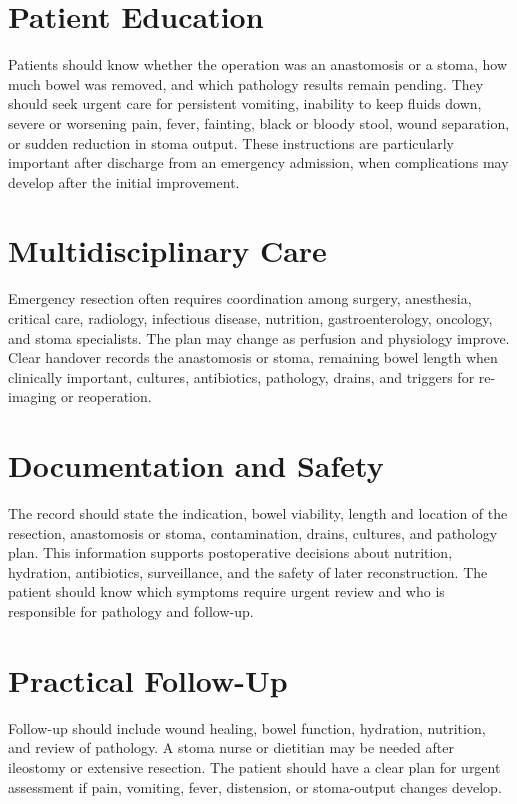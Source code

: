 \section*{Patient Education}
Patients should know whether the operation was an anastomosis or a stoma, how much bowel was removed, and which pathology results remain pending. They should seek urgent care for persistent vomiting, inability to keep fluids down, severe or worsening pain, fever, fainting, black or bloody stool, wound separation, or sudden reduction in stoma output. These instructions are particularly important after discharge from an emergency admission, when complications may develop after the initial improvement.

\section*{Multidisciplinary Care}
Emergency resection often requires coordination among surgery, anesthesia, critical care, radiology, infectious disease, nutrition, gastroenterology, oncology, and stoma specialists. The plan may change as perfusion and physiology improve. Clear handover records the anastomosis or stoma, remaining bowel length when clinically important, cultures, antibiotics, pathology, drains, and triggers for re-imaging or reoperation.

\section*{Documentation and Safety}
The record should state the indication, bowel viability, length and location of the resection, anastomosis or stoma, contamination, drains, cultures, and pathology plan. This information supports postoperative decisions about nutrition, hydration, antibiotics, surveillance, and the safety of later reconstruction. The patient should know which symptoms require urgent review and who is responsible for pathology and follow-up.

\section*{Practical Follow-Up}
Follow-up should include wound healing, bowel function, hydration, nutrition, and review of pathology. A stoma nurse or dietitian may be needed after ileostomy or extensive resection. The patient should have a clear plan for urgent assessment if pain, vomiting, fever, distension, or stoma-output changes develop.

